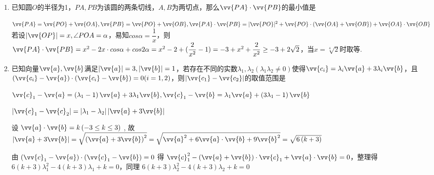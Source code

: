 \begin{enumerate}
\begin{enumerate}
\begin{jieda}
\begin{dingautolist}{172}
                故$\vv{AM}\cdot \vv{AN} \in [4, 8-2\sqrt{2}]$
            \end{dingautolist}
        \end{jieda}
        
        \item 已知圆$O$的半径为1，$PA, PB$为该圆的两条切线，$A, B$为两切点，那么$\vv{PA} \cdot \vv{PB}$的最小值是
        \begin{jieda}
            $\vv{PA} = \vv{PO} + \vv{OA}, \vv{PB} = \vv{PO} + \vv{OB}, \vv{PA} \cdot \vv{PB} = |\vv{PO}|^2 + \vv{PO} \cdot (\vv{OA} + \vv{OB}) + \vv{OA} \cdot \vv{OB}$ \\
            若设$|\vv{OP}| = x, \angle POA = \alpha$，易知$cos\alpha = \dfrac{1}{x}$，则$\vv{PA} \cdot \vv{PB} = x^2 - 2x\cdot cos\alpha + cos2\alpha = x^2 - 2 + (\dfrac{2}{x^2} - 1) = -3 + x^2 + \dfrac{2}{x^2} \geq -3 + 2\sqrt{2}$，当$x = \sqrt[4]{2}$时取等.
        \end{jieda}
        
        
        \item 已知向量$\vv{a}, \vv{b}$满足$|\vv{a}| = 3, |\vv{b}| = 1$，若存在不同的实数$\lambda_1, \lambda_2(\lambda_1 \lambda_2 \neq 0)$使得$\vv{c_i} = \lambda_i \vv{a} + 3\lambda_i \vv{b}$，且$(\vv{c_i}-\vv{a}) \cdot (\vv{c_i} - \vv{b}) = 0 (i = 1, 2)$，则$|\vv{c_1} - \vv{c_2}|$的取值范围是\blkda[4]{$[2, 2\sqrt{2}) \cup (2\sqrt{2}, 2\sqrt{3})$}
        \begin{jieda}
            ${\vv{c}}_{1} - \vv{a} = \left( {{\lambda }_{1} - 1}\right) \vv{a} + 3{\lambda }_{1}\vv{b},{\vv{c}}_{1} - \vv{b} = {\lambda }_{1}\vv{a} + \left( {3{\lambda }_{1} - 1}\right) \vv{b}$
            
            $\left| {{\vv{c}}_{1} - {\vv{c}}_{2}}\right|  = \left| {{\lambda }_{1} - {\lambda }_{2}}\right| \left| {\vv{a} + 3\vv{b}}\right|$
            
            设 $\vv{a} \cdot  \vv{b} = k\left( {-3 \leq  k \leq  3}\right)$ , 故$\left| {\vv{a} + 3\vv{b}}\right|  = \sqrt{{\left( \vv{a} + 3\vv{b}\right) }^{2}} = \sqrt{{\vv{a}}^{2} + 6\vv{a} \cdot  \vv{b} + 9{\vv{b}}^{2}} = \sqrt{6\left( {k + 3}\right) }$
            
            由 $\left( {{\vv{c}}_{1} - \vv{a}}\right)  \cdot  \left( {{\vv{c}}_{1} - \vv{b}}\right)  = 0$ 得 ${\vv{c}}_{1}^{2} - \left( {\vv{a} + \vv{b}}\right)  \cdot  {\vv{c}}_{1} + \vv{a} \cdot  \vv{b} = 0$，整理得 $6\left( {k + 3}\right) {\lambda }_{1}^{2} - 4\left( {k + 3}\right) {\lambda }_{1} + k = 0$，同理 $6\left( {k + 3}\right) {\lambda }_{2}^{2} - 4\left( {k + 3}\right) {\lambda }_{2} + k = 0$


\end{jieda}
\end{enumerate}
\end{enumerate}
